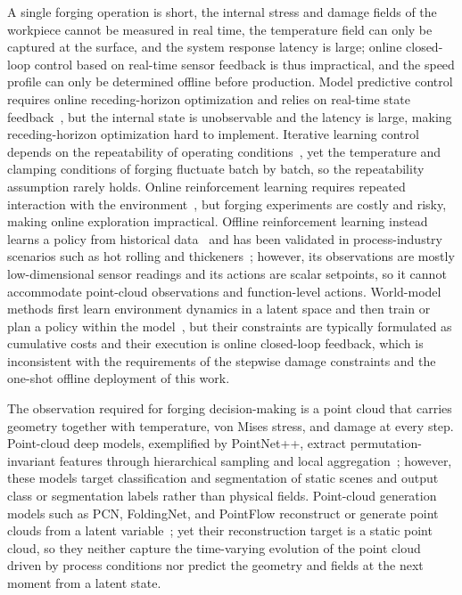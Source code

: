 A single forging operation is short, the internal stress and damage fields of the workpiece cannot be measured in real time, the temperature field can only be captured at the surface, and the system response latency is large; online closed-loop control based on real-time sensor feedback is thus impractical, and the speed profile can only be determined offline before production. Model predictive control requires online receding-horizon optimization and relies on real-time state feedback~\cite{kouvaritakis2016model}, but the internal state is unobservable and the latency is large, making receding-horizon optimization hard to implement. Iterative learning control depends on the repeatability of operating conditions~\cite{ahn2007iterative}, yet the temperature and clamping conditions of forging fluctuate batch by batch, so the repeatability assumption rarely holds. Online reinforcement learning requires repeated interaction with the environment~\cite{dharmadhikari2023reinforcement}, but forging experiments are costly and risky, making online exploration impractical. Offline reinforcement learning instead learns a policy from historical data~\cite{levine2020offline} and has been validated in process-industry scenarios such as hot rolling and thickeners~\cite{zhan2022deepthermal, 10705802}; however, its observations are mostly low-dimensional sensor readings and its actions are scalar setpoints, so it cannot accommodate point-cloud observations and function-level actions. World-model methods first learn environment dynamics in a latent space and then train or plan a policy within the model~\cite{hafner2020mastering}, but their constraints are typically formulated as cumulative costs and their execution is online closed-loop feedback, which is inconsistent with the requirements of the stepwise damage constraints and the one-shot offline deployment of this work.

The observation required for forging decision-making is a point cloud that carries geometry together with temperature, von Mises stress, and damage at every step. Point-cloud deep models, exemplified by PointNet++, extract permutation-invariant features through hierarchical sampling and local aggregation~\cite{qi2017pointnetpp}; however, these models target classification and segmentation of static scenes and output class or segmentation labels rather than physical fields. Point-cloud generation models such as PCN, FoldingNet, and PointFlow reconstruct or generate point clouds from a latent variable~\cite{yuan2018pcn, yang2018foldingnet, li2019pointflow}; yet their reconstruction target is a static point cloud, so they neither capture the time-varying evolution of the point cloud driven by process conditions nor predict the geometry and fields at the next moment from a latent state.

